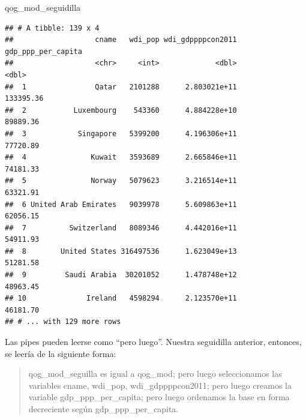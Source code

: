 \documentclass[]{book}
\newenvironment{Shaded}{\begin{snugshade}}{\end{snugshade}}
\newcommand{\KeywordTok}[1]{\textcolor[rgb]{0.13,0.29,0.53}{\textbf{#1}}}
\newcommand{\DataTypeTok}[1]{\textcolor[rgb]{0.13,0.29,0.53}{#1}}
\newcommand{\StringTok}[1]{\textcolor[rgb]{0.31,0.60,0.02}{#1}}
\newcommand{\OperatorTok}[1]{\textcolor[rgb]{0.81,0.36,0.00}{\textbf{#1}}}
\newcommand{\NormalTok}[1]{#1}
\begin{document}
\begin{Shaded}
\end{Shaded}

\begin{Shaded}
\begin{Highlighting}[]
\NormalTok{qog_mod_seguidilla}
\end{Highlighting}
\end{Shaded}

\begin{verbatim}
## # A tibble: 139 x 4
##                   cname   wdi_pop wdi_gdppppcon2011 gdp_ppp_per_capita
##                   <chr>     <int>             <dbl>              <dbl>
##  1                Qatar   2101288      2.803021e+11          133395.36
##  2           Luxembourg    543360      4.884228e+10           89889.36
##  3            Singapore   5399200      4.196306e+11           77720.89
##  4               Kuwait   3593689      2.665846e+11           74181.33
##  5               Norway   5079623      3.216514e+11           63321.91
##  6 United Arab Emirates   9039978      5.609863e+11           62056.15
##  7          Switzerland   8089346      4.442016e+11           54911.93
##  8        United States 316497536      1.623049e+13           51281.58
##  9         Saudi Arabia  30201052      1.478748e+12           48963.45
## 10              Ireland   4598294      2.123570e+11           46181.70
## # ... with 129 more rows
\end{verbatim}

Las pipes pueden leerse como ``pero luego''. Nuestra seguidilla
anterior, entonces, se leería de la siguiente forma:

\begin{quote}
qog\_mod\_seguilla es igual a qog\_mod; pero luego seleccionamos las
variables cname, wdi\_pop, wdi\_gdppppcon2011; pero luego creamos la
variable gdp\_ppp\_per\_capita; pero luego ordenamos la base en forma
decreciente según gdp\_ppp\_per\_capita.
\end{quote}
\end{document}
